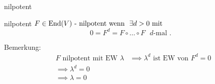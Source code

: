 \documentclass[class=article, crop=false]{standalone}
\begin{document}
\begin{zettel}{nilpotent}
\begin{flashcard}[fjhi888p]{nilpotent}
	$F \in  \End(V) \text{ - nilpotent wenn } \exists d > 0 \text{ mit }$
	\[
		0 = F^{d} = F \circ \dots \circ  F \text{ $d$-mal }
	.\]
\end{flashcard}

Bemerkung:
\begin{align*}
	 & F \text{ nilpotent mit EW } \lambda
	 & \implies \lambda^d \text{ ist EW von } F^{d} = 0 \\
	 & \implies \lambda^d = 0                           \\
	 & \implies \lambda  = 0
\end{align*}

\end{zettel}
\end{document}
